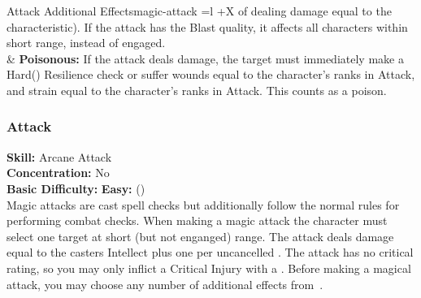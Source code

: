 \begin{table*}[!htb]
\begin{GenesysTable}{Attack Additional Effects}{magic-attack}{ =l +X}
                            of dealing damage equal to the characteristic). If the attack has the  Blast quality, it affects
                            all characters within short range, instead of engaged.\\
\difficulty\difficulty  & \textbf{Poisonous:} If the attack deals damage, the target must immediately make a
                            Hard(\difficulty\difficulty\difficulty) Resilience check or suffer wounds equal to the character's
                            ranks in Attack, and strain equal to the character's ranks in Attack. This counts as a poison.\\
\end{GenesysTable}
\end{table*}

\subsubsection{Attack}
\textbf{Skill:} Arcane Attack\\
\textbf{Concentration:} No\\
\textbf{Basic Difficulty:} \textbf{Easy:} (\difficulty)\\
Magic attacks are cast spell checks but additionally follow the normal rules for
performing combat checks. When making a magic attack the character must select
one target at short (but not enganged) range. The attack deals damage equal to
the casters Intellect plus one per uncancelled \success. The attack has no
critical rating, so you may only inflict a Critical Injury with a \triumph.
Before making a magical attack, you may choose any number of additional effects
from~.

